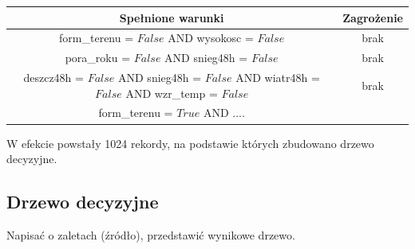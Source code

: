 \begin{center}
	\begin{tabular}{|c|c|} 
		\hline
		Spełnione warunki & Zagrożenie \\ 
		\hline
		form\_terenu = $False$ AND wysokosc = $False$ & brak \\
		\hline
		pora\_roku = $False$ AND snieg48h = $False$  & brak \\
		\hline
		deszcz48h = $False$ AND snieg48h = $False$ AND wiatr48h = $False$ AND wzr\_temp = $False$ & brak \\
		\hline 
		form\_terenu = $True$ AND ....
		
	\end{tabular}
\end{center}

W efekcie powstały 1024 rekordy, na podstawie których zbudowano drzewo decyzyjne.
\subsection{Drzewo decyzyjne}
Napisać o zaletach (źródło), przedstawić wynikowe drzewo.
